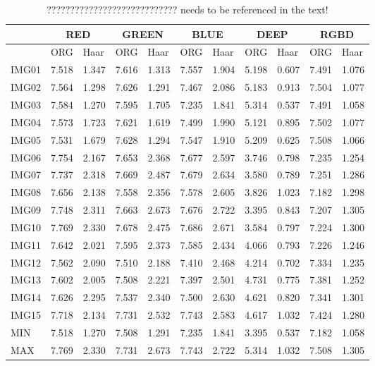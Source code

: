 \begin{table*}
\begin{tabular}{|l||l|l|l|l|l|l|l|l|l|l|}\hline
& \multicolumn{2}{|c|}{\color{red}RED} & \multicolumn{2}{|c|}{\color{green}GREEN} & \multicolumn{2}{|c|}{\color{blue}BLUE} & \multicolumn{2}{|c|}{DEEP} &  \multicolumn{2}{|c|}{RGBD} \\\hline

& ORG & Haar & ORG & Haar & ORG & Haar & ORG & Haar & ORG & Haar \\\hline\hline
IMG01 & 7.518 & 1.347 & 7.616 & 1.313 & 7.557 & 1.904 & 5.198 & 0.607 & 7.491 & 1.076 \\\hline
IMG02 & 7.564 & 1.298 & 7.626 & 1.291 & 7.467 & 2.086 & 5.183 & 0.913 & 7.504 & 1.077 \\\hline
IMG03 & 7.584 & 1.270 & 7.595 & 1.705 & 7.235 & 1.841 & 5.314 & 0.537 & 7.491 & 1.058 \\\hline
IMG04 & 7.573 & 1.723 & 7.621 & 1.619 & 7.499 & 1.990 & 5.121 & 0.895 & 7.502 & 1.077 \\\hline
IMG05 & 7.531 & 1.679 & 7.628 & 1.294 & 7.547 & 1.910 & 5.209 & 0.625 & 7.508 & 1.066 \\\hline
IMG06 & 7.754 & 2.167 & 7.653 & 2.368 & 7.677 & 2.597 & 3.746 & 0.798 & 7.235 & 1.254 \\\hline
IMG07 & 7.737 & 2.318 & 7.669 & 2.487 & 7.679 & 2.634 & 3.580 & 0.789 & 7.251 & 1.286 \\\hline
IMG08 & 7.656 & 2.138 & 7.558 & 2.356 & 7.578 & 2.605 & 3.826 & 1.023 & 7.182 & 1.298 \\\hline
IMG09 & 7.748 & 2.311 & 7.663 & 2.673 & 7.676 & 2.722 & 3.395 & 0.843 & 7.207 & 1.305 \\\hline
IMG10 & 7.769 & 2.330 & 7.678 & 2.475 & 7.686 & 2.671 & 3.584 & 0.797 & 7.224 & 1.300 \\\hline
IMG11 & 7.642 & 2.021 & 7.595 & 2.373 & 7.585 & 2.434 & 4.066 & 0.793 & 7.226 & 1.246 \\\hline
IMG12 & 7.562 & 2.090 & 7.510 & 2.188 & 7.410 & 2.468 & 4.214 & 0.702 & 7.334 & 1.235 \\\hline
IMG13 & 7.602 & 2.005 & 7.508 & 2.221 & 7.397 & 2.501 & 4.731 & 0.775 & 7.381 & 1.252 \\\hline
IMG14 & 7.626 & 2.295 & 7.537 & 2.340 & 7.500 & 2.630 & 4.621 & 0.820 & 7.341 & 1.301 \\\hline
IMG15 & 7.718 & 2.134 & 7.731 & 2.532 & 7.743 & 2.583 & 4.617 & 1.032 & 7.424 & 1.280 \\\hline\hline
MIN & 7.518 & 1.270 & 7.508 & 1.291 & 7.235 & 1.841 & 3.395 & 0.537 & 7.182 & 1.058 \\\hline
MAX & 7.769 & 2.330 & 7.731 & 2.673 & 7.743 & 2.722 & 5.314 & 1.032 & 7.508 & 1.305 \\\hline
\end{tabular}
\caption{\color{red}  ???????????????????????????? needs to be referenced in the text!}
\end{table*}

